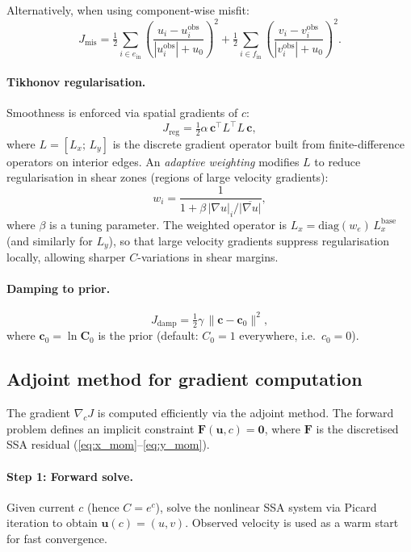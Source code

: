 \documentclass[a4paper,11pt,fleqn]{article}
\newcommand{\ve}[1]{\boldsymbol{#1}}
\newcommand{\be}{\begin{equation}}
\newcommand{\ee}{\end{equation}}
\newcommand{\half}{\tfrac{1}{2}}
\begin{document}
Alternatively, when using component-wise misfit:
\be
\label{eq:Jmis_comp}
J_{\mathrm{mis}} = \half \sum_{i \in e_{\mathrm{in}}} \left(\frac{u_i - u_i^{\mathrm{obs}}}{|u_i^{\mathrm{obs}}| + u_0}\right)^2 + \half \sum_{i \in f_{\mathrm{in}}} \left(\frac{v_i - v_i^{\mathrm{obs}}}{|v_i^{\mathrm{obs}}| + u_0}\right)^2.
\ee

\paragraph{Tikhonov regularisation.}
Smoothness is enforced via spatial gradients of $c$:
\be
\label{eq:Jreg}
J_{\mathrm{reg}} = \half \alpha\, \ve{c}^\top L^\top L\, \ve{c},
\ee
where $L = [L_x;\, L_y]$ is the discrete gradient operator built from finite-difference operators on interior edges. An \emph{adaptive weighting} modifies $L$ to reduce regularisation in shear zones (regions of large velocity gradients):
\be
w_i = \frac{1}{1 + \beta\,|\nabla u|_i / \overline{|\nabla u|}},
\ee
where $\beta$ is a tuning parameter. The weighted operator is $L_x = \mathrm{diag}(w_e)\, L_x^{\mathrm{base}}$ (and similarly for $L_y$), so that large velocity gradients suppress regularisation locally, allowing sharper $C$-variations in shear margins.

\paragraph{Damping to prior.}
\be
\label{eq:Jdamp}
J_{\mathrm{damp}} = \half \gamma\, \|\ve{c} - \ve{c}_0\|^2,
\ee
where $\ve{c}_0 = \ln \ve{C}_0$ is the prior (default: $C_0 = 1$ everywhere, i.e.\ $c_0 = 0$).

\subsection{Adjoint method for gradient computation}
\label{sec:adjoint}

The gradient $\nabla_c J$ is computed efficiently via the adjoint method. The forward problem defines an implicit constraint $\ve{F}(\ve{u}, c) = \ve{0}$, where $\ve{F}$ is the discretised SSA residual (\ref{eq:x_mom}--\ref{eq:y_mom}).

\paragraph{Step 1: Forward solve.}
Given current $c$ (hence $C = e^c$), solve the nonlinear SSA system via Picard iteration to obtain $\ve{u}(c) = (u, v)$. Observed velocity is used as a warm start for fast convergence.
\end{document}
